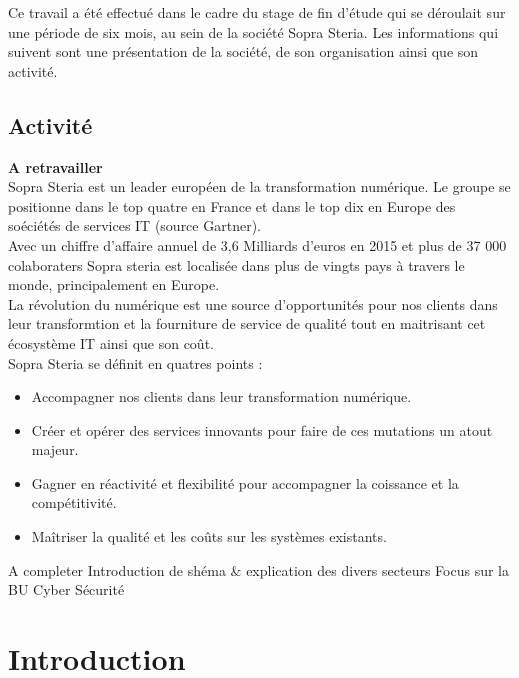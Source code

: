 \documentclass[a4paper]{memoir}
\begin{document}
Ce travail a été effectué dans le cadre du stage de fin d'étude qui se déroulait sur une période de six mois, au sein de la société Sopra Steria.
Les informations qui suivent sont une présentation de la société, de son organisation ainsi que son activité.

\section*{Activité}

\textbf{A retravailler}\\

Sopra Steria est un leader européen de la transformation numérique. Le groupe se positionne dans le top quatre en France et dans le top dix en Europe des soéciétés de services IT (source Gartner).\\
Avec un chiffre d'affaire annuel de 3,6 Milliards d'euros en 2015 et plus de 37 000 colaboraters Sopra steria est localisée dans plus de vingts pays à travers le monde, principalement en Europe.\\

La révolution du numérique est une source d'opportunités pour nos clients dans leur transformtion et la fourniture de service de qualité tout en maitrisant cet écosystème IT ainsi que son coût.\\
Sopra Steria se définit en quatres points :

\begin{itemize}
    \item Accompagner nos clients dans leur transformation numérique.
    \item Créer et opérer des services innovants pour faire de ces mutations un atout majeur.
    \item Gagner en réactivité et flexibilité pour accompagner la coissance et la compétitivité.
    \item Maîtriser la qualité et les coûts sur les systèmes existants.
\end{itemize}

A completer
Introduction de shéma \& explication des divers secteurs
Focus sur la BU Cyber Sécurité



\cleardoublepage
\tableofcontents*


\mainmatter%


\chapter*{Introduction}
\end{document}
